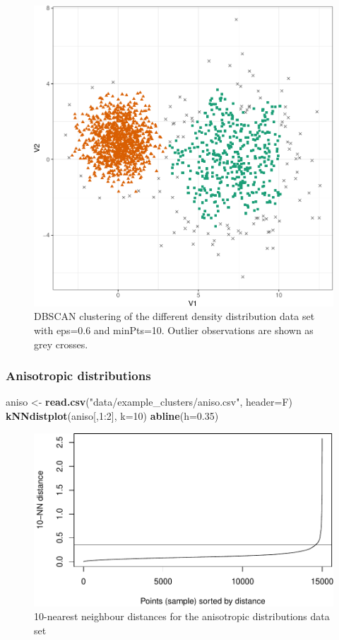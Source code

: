 \documentclass[]{book}
\newenvironment{Shaded}{\begin{snugshade}}{\end{snugshade}}
\newcommand{\KeywordTok}[1]{\textcolor[rgb]{0.13,0.29,0.53}{\textbf{{#1}}}}
\newcommand{\DataTypeTok}[1]{\textcolor[rgb]{0.13,0.29,0.53}{{#1}}}
\newcommand{\DecValTok}[1]{\textcolor[rgb]{0.00,0.00,0.81}{{#1}}}
\newcommand{\FloatTok}[1]{\textcolor[rgb]{0.00,0.00,0.81}{{#1}}}
\newcommand{\StringTok}[1]{\textcolor[rgb]{0.31,0.60,0.02}{{#1}}}
\newcommand{\NormalTok}[1]{{#1}}
\theoremstyle{definition}
\theoremstyle{definition}
\theoremstyle{definition}
\theoremstyle{remark}
\begin{document}
\begin{figure}

{\centering \includegraphics[width=0.6\linewidth]{09-clustering_files/figure-latex/diffDensityDBSCANscatter2-1} 

}

\caption{DBSCAN clustering of the different density distribution data set with eps=0.6 and minPts=10. Outlier observations are shown as grey crosses.}\label{fig:diffDensityDBSCANscatter2}
\end{figure}

\subsubsection{Anisotropic
distributions}\label{anisotropic-distributions-1}

\begin{Shaded}
\begin{Highlighting}[]
\NormalTok{aniso <-}\StringTok{ }\KeywordTok{read.csv}\NormalTok{(}\StringTok{"data/example_clusters/aniso.csv"}\NormalTok{, }\DataTypeTok{header=}\NormalTok{F)}
\KeywordTok{kNNdistplot}\NormalTok{(aniso[,}\DecValTok{1}\NormalTok{:}\DecValTok{2}\NormalTok{], }\DataTypeTok{k=}\DecValTok{10}\NormalTok{)}
\KeywordTok{abline}\NormalTok{(}\DataTypeTok{h=}\FloatTok{0.35}\NormalTok{)}
\end{Highlighting}
\end{Shaded}

\begin{figure}

{\centering \includegraphics[width=0.75\linewidth]{09-clustering_files/figure-latex/anisoKNNdist-1} 

}

\caption{10-nearest neighbour distances for the anisotropic distributions data set}\label{fig:anisoKNNdist}
\end{figure}
\end{document}

